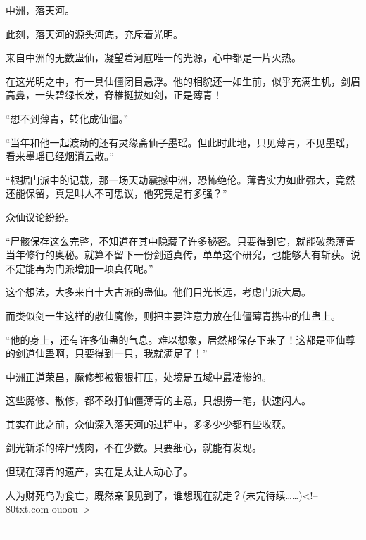 \begin{this_body}
中洲，落天河。

此刻，落天河的源头河底，充斥着光明。

来自中洲的无数蛊仙，凝望着河底唯一的光源，心中都是一片火热。

在这光明之中，有一具仙僵闭目悬浮。他的相貌还一如生前，似乎充满生机，剑眉高鼻，一头碧绿长发，脊椎挺拔如剑，正是薄青！

“想不到薄青，转化成仙僵。”

“当年和他一起渡劫的还有灵缘斋仙子墨瑶。但此时此地，只见薄青，不见墨瑶，看来墨瑶已经烟消云散。”

“根据门派中的记载，那一场天劫震撼中洲，恐怖绝伦。薄青实力如此强大，竟然还能保留，真是叫人不可思议，他究竟是有多强？”

众仙议论纷纷。

“尸骸保存这么完整，不知道在其中隐藏了许多秘密。只要得到它，就能破悉薄青当年修行的奥秘。就算不留下一份剑道真传，单单这个研究，也能够大有斩获。说不定能再为门派增加一项真传呢。”

这个想法，大多来自十大古派的蛊仙。他们目光长远，考虑门派大局。

而类似剑一生这样的散仙魔修，则把主要注意力放在仙僵薄青携带的仙蛊上。

“他的身上，还有许多仙蛊的气息。难以想象，居然都保存下来了！这都是亚仙尊的剑道仙蛊啊，只要得到一只，我就满足了！”

中洲正道荣昌，魔修都被狠狠打压，处境是五域中最凄惨的。

这些魔修、散修，都不敢打仙僵薄青的主意，只想捞一笔，快速闪人。

其实在此之前，众仙深入落天河的过程中，多多少少都有些收获。

剑光斩杀的碎尸残肉，不在少数。只要细心，就能有发现。

但现在薄青的遗产，实在是太让人动心了。

人为财死鸟为食亡，既然亲眼见到了，谁想现在就走？(未完待续……)<!--80txt.com-ouoou-->

------------

\end{this_body}

